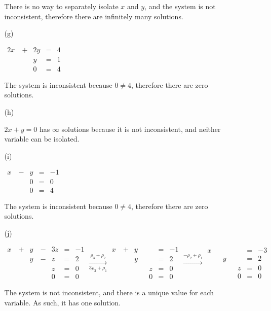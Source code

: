 \documentclass{article}
\begin{document}
\begin{enumerate}
\begin{enumerate}
There is no way to separately isolate $x$ and $y$, and the system is not inconsistent, therefore there are infinitely many solutions.

\item[(g)]

$\begin{aligned}
2x&\ +&2y&=&4\\
&&y&=&1\\
&&0&=&4
\end{aligned}$

The system is inconsistent because $0\neq4$, therefore there are zero solutions.

\item[(h)]

$2x+y=0$ has $\infty$ solutions because it is not inconsistent, and neither variable can be isolated.

\item[(i)]

$\begin{aligned}
x&\ -&y&=&-1\\
&&0&=&0\\
&&0&=&4
\end{aligned}$

The system is inconsistent because $0\neq4$, therefore there are zero solutions.

\item[(j)]

$\begin{aligned}
x&\ +&y&\ -&3z&=&-1\\
&&y&\ -&z&=&2\\
&&&&z&=&0\\
&&&&0&=&0
\end{aligned}
\underset{3\rho_3+\rho_1}{\overset{\rho_3+\rho_2}{\longrightarrow}}
\begin{aligned}
x&\ +&y&&&=&-1\\
&&y&&&=&2\\
&&&&z&=&0\\
&&&&0&=&0
\end{aligned}
\overset{-\rho_2+\rho_1}{\longrightarrow}
\begin{aligned}
x&&&&&=&-3\\
&&y&&&=&2\\
&&&&z&=&0\\
&&&&0&=&0
\end{aligned}$

The system is not inconsistent, and there is a unique value for each variable. As such, it has one solution.
\end{enumerate}


\end{enumerate}
\end{document}
